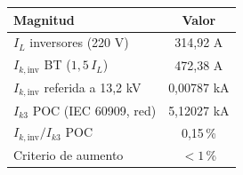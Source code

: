 \begin{tabular}{lc}
\toprule
\textbf{Magnitud} & \textbf{Valor} \\
\midrule
$I_L$ inversores (220 V) & 314,92 A \\
$I_{k,\mathrm{inv}}$ BT ($1{,}5\,I_L$) & 472,38 A \\
$I_{k,\mathrm{inv}}$ referida a 13,2 kV & 0,00787 kA \\
$I_{k3}$ POC (IEC 60909, red) & 5,12027 kA \\
$I_{k,\mathrm{inv}}/I_{k3}$ POC & 0,15\,\% \\
Criterio de aumento & $< 1$\,\% \\
\bottomrule
\end{tabular}
